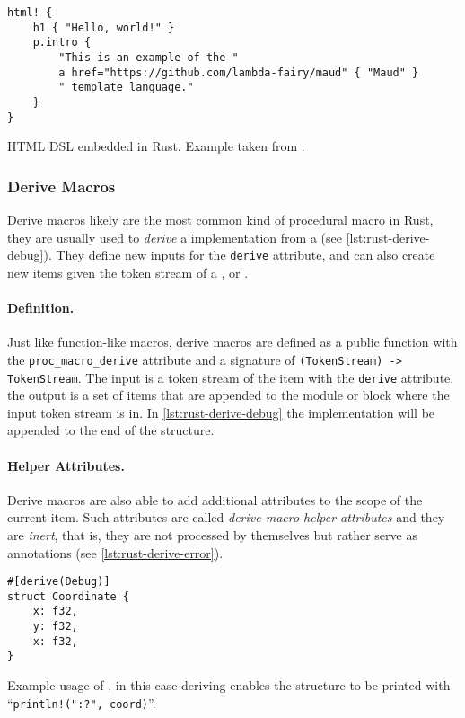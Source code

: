 \begin{listing}
    \begin{verbatim}
html! {
    h1 { "Hello, world!" }
    p.intro {
        "This is an example of the "
        a href="https://github.com/lambda-fairy/maud" { "Maud" }
        " template language."
    }
}
    \end{verbatim}
    \caption{HTML DSL embedded in Rust. Example taken from \autocite{Wong2021}.}
    \label{lst:rust-html-dsl}
\end{listing}

\subsubsection*{Derive Macros}\label{sec:rust-macros:proc:derive}
Derive macros likely are the most common kind of procedural macro in Rust,
they are usually used to \emph{derive} a  implementation from a  (see \autoref{lst:rust-derive-debug}).
They define new inputs for the \texttt{derive} attribute,
and can also create new items given the token stream of a ,  or .

\paragraph{Definition.}
Just like function-like macros,
derive macros are defined as a public function with the \texttt{proc\_macro\_derive} attribute
and a signature of \texttt{(TokenStream) -> TokenStream}.
The input is a token stream of the item with the \texttt{derive} attribute,
the output is a set of items that are appended to the module or block where the input token stream is in.
In \autoref{lst:rust-derive-debug} the  implementation will be appended to the end of the structure.

\paragraph{Helper Attributes.}
Derive macros are also able to add additional attributes to the scope of the current item.
Such attributes are called \emph{derive macro helper attributes} and they are \emph{inert},
that is, they are not processed by themselves but rather serve as annotations (see \autoref{lst:rust-derive-error}).

\begin{listing}
    \centering
    \begin{verbatim}
#[derive(Debug)]
struct Coordinate {
    x: f32,
    y: f32,
    x: f32,
}
    \end{verbatim}
    \caption{
    Example usage of \keyword{\#[derive(...)]},
    in this case deriving  enables the structure to be printed with
    “\texttt{println!("{:?}", coord)}”.
    }
    \label{lst:rust-derive-debug}
\end{listing}

